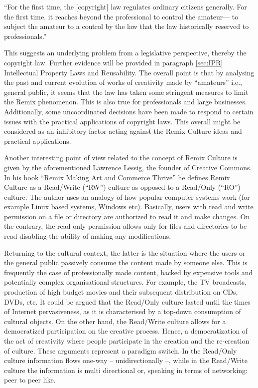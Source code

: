 \begin{displayquote}

“For the first time, the [copyright] law regulates ordinary citizens generally. For the first time, it reaches beyond the professional to control the amateur— to subject the amateur to a control by the law that the law historically reserved to professionals.”

\end{displayquote}

This suggests an underlying problem from a legislative perspective, thereby the copyright law. Further evidence will be provided in paragraph \ref{sec:IPR} Intellectual Property Laws and Reusability. The overall point is that by analysing the past and current evolution of works of creativity made by “amateurs” i.e., general public, it seems that the law has taken some stringent measures to limit the Remix phenomenon. This is also true for professionals and large businesses. Additionally, some uncoordinated decisions have been made to respond to certain issues with the practical applications of copyright laws. This overall might be considered as an inhibitory factor acting against the Remix Culture ideas and practical applications.

Another interesting point of view related to the concept of Remix Culture is given by the aforementioned Lawrence Lessig, the founder of Creative Commons. In his book “Remix Making Art and Commerce Thrive” he defines Remix Culture as a Read/Write (“RW”) culture as opposed to a Read/Only (“RO”) culture. The author uses an analogy of how popular computer systems work (for example Linux based systems, Windows etc). Basically, users with read and write permission on a file or directory are authorized to read it and make changes. On the contrary, the read only permission allows only for files and directories to be read disabling the ability of making any modifications.

Returning to the cultural context, the latter is the situation where the users or the general public passively consume the content made by someone else. This is frequently the case of professionally made content, backed by expensive tools and potentially complex organisational structures. For example, the TV broadcasts, production of high budget movies and their subsequent distribution on CDs, DVDs, etc. It could be argued that the Read/Only culture lasted until the times of Internet pervasiveness, as it is characterised by a top-down consumption of cultural objects. On the other hand, the Read/Write culture allows for a democratized participation on the creative process. Hence, a democratization of the act of creativity where people participate in the creation and the re-creation of culture.
These arguments represent a paradigm switch. In the Read/Only culture information flows one-way – unidirectionally –, while in the Read/Write culture the information is multi directional or, speaking in terms of networking: peer to peer like.

